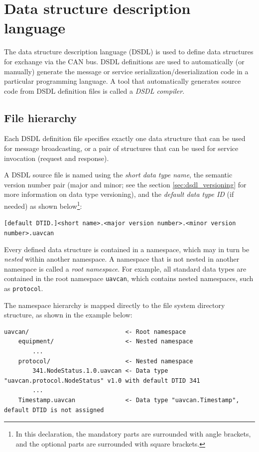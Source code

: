 \chapter{Data structure description language}\label{sec:dsdl}

The data structure description language (DSDL) is used to define data structures for exchange via the CAN bus.
DSDL definitions are used to automatically (or manually) generate the message or service
serialization/deserialization code in a particular programming language.
A tool that automatically generates source code from DSDL definition files is called a \emph{DSDL compiler}.

\section{File hierarchy}

Each DSDL definition file specifies exactly one data structure that can be used for message broadcasting,
or a pair of structures that can be used for service invocation (request and response).

A DSDL source file is named using the \emph{short data type name},
the semantic version number pair (major and minor; see the section \ref{sec:dsdl_versioning}
for more information on data type versioning),
and the \emph{default data type ID} (if needed) as shown
below\footnote{In this declaration, the mandatory parts are surrounded with angle brackets,
and the optional parts are surrounded with square brackets.}:

\verb|[default DTID.]<short name>.<major version number>.<minor version number>.uavcan|

Every defined data structure is contained in a namespace,
which may in turn be \emph{nested} within another namespace.
A namespace that is not nested in another namespace is called a \emph{root namespace}.
For example, all standard data types are contained in the root namespace \verb|uavcan|,
which contains nested namespaces, such as \verb|protocol|.

The namespace hierarchy is mapped directly to the file system directory structure,
as shown in the example below:

\begin{verbatim}
uavcan/                           <- Root namespace
    equipment/                    <- Nested namespace
        ...
    protocol/                     <- Nested namespace
        341.NodeStatus.1.0.uavcan <- Data type "uavcan.protocol.NodeStatus" v1.0 with default DTID 341
        ...
    Timestamp.uavcan              <- Data type "uavcan.Timestamp", default DTID is not assigned
\end{verbatim}

